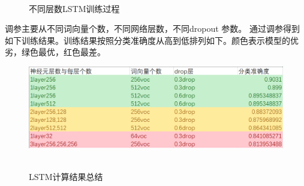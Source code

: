 \documentclass[UTF8]{ctexart}
\begin{document}
\begin{figure}[H]
  \centering
   \\
  \caption{不同层数LSTM训练过程}
  \label{fig:oscil}
\end{figure}
调参主要从不同词向量个数，不同网络层数，不同dropout 参数。
通过调参得到如下训练结果。训练结果按照分类准确度从高到低排列如下。颜色表示模型的优劣，绿色最优，红色最差。

\begin{figure}[H]
  \centering
  \label{fig:Per6A}\includegraphics[width=1\textwidth]{excelRS.png}\
  \caption{LSTM计算结果总结}
  \label{fig:oscil}
\end{figure}
\end{document}
